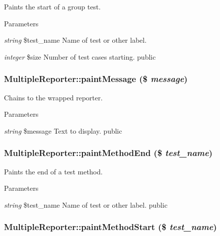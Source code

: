 \label{class_multiple_reporter_a124c97c84dc679cc6ad14aa2012bb444}
Paints the start of a group test. 
\begin{DoxyParams}{Parameters}
\item[{\em string}]\$test\_\-name Name of test or other label. \item[{\em integer}]\$size Number of test cases starting.  public \end{DoxyParams}
\hypertarget{class_multiple_reporter_a3e406bb8e7497250a5c7f740750ed9c9}{
\subsubsection[{paintMessage}]{\setlength{\rightskip}{0pt plus 5cm}MultipleReporter::paintMessage (\$ {\em message})}}
\label{class_multiple_reporter_a3e406bb8e7497250a5c7f740750ed9c9}
Chains to the wrapped reporter. 
\begin{DoxyParams}{Parameters}
\item[{\em string}]\$message Text to display.  public \end{DoxyParams}
\hypertarget{class_multiple_reporter_aa38b4e0798db871b957384656377cd33}{
\subsubsection[{paintMethodEnd}]{\setlength{\rightskip}{0pt plus 5cm}MultipleReporter::paintMethodEnd (\$ {\em test\_\-name})}}
\label{class_multiple_reporter_aa38b4e0798db871b957384656377cd33}
Paints the end of a test method. 
\begin{DoxyParams}{Parameters}
\item[{\em string}]\$test\_\-name Name of test or other label.  public \end{DoxyParams}
\hypertarget{class_multiple_reporter_adf97d0d391f684bffccebc70d4b1c6be}{
\subsubsection[{paintMethodStart}]{\setlength{\rightskip}{0pt plus 5cm}MultipleReporter::paintMethodStart (\$ {\em test\_\-name})}}
